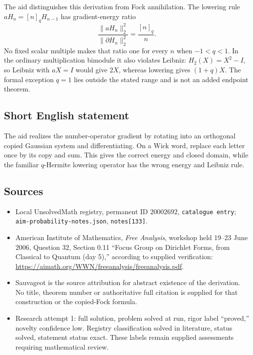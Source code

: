 \documentclass[11pt]{article}
\begin{document}
The aid distinguishes this derivation from Fock annihilation. The lowering rule $aH_n=[n]_qH_{n-1}$ has gradient-energy ratio
\[
\frac{\|aH_n\|_2^2}{\|\partial H_n\|_2^2}=\frac{[n]_q}{n}.
\]
No fixed scalar multiple makes that ratio one for every $n$ when $-1<q<1$. In the ordinary multiplication bimodule it also violates Leibniz: $H_2(X)=X^2-I$, so Leibniz with $aX=I$ would give $2X$, whereas lowering gives $(1+q)X$. The formal exception $q=1$ lies outside the stated range and is not an added endpoint theorem.
\subsection{Short English statement}
The aid realizes the number-operator gradient by rotating into an orthogonal copied Gaussian system and differentiating. On a Wick word, replace each letter once by its copy and sum. This gives the correct energy and closed domain, while the familiar $q$-Hermite lowering operator has the wrong energy and Leibniz rule.
\subsection{Sources}
\begin{itemize}
\item Local UnsolvedMath registry, permanent ID $20002692$, \texttt{catalogue entry}; \texttt{aim-probability-notes.json}, \texttt{notes[133]}.
\item American Institute of Mathematics, \emph{Free Analysis}, workshop held 19--23 June 2006, Question 32, Section 0.11 ``Focus Group on Dirichlet Forms, from Classical to Quantum (day 5),'' according to supplied verification: \url{https://aimath.org/WWN/freeanalysis/freeanalysis.pdf}.
\item Sauvageot is the source attribution for abstract existence of the derivation. No title, theorem number or authoritative full citation is supplied for that construction or the copied-Fock formula.
\item Research attempt 1: full solution, problem solved at run, rigor label ``proved,'' novelty confidence low. Registry classification solved in literature, status solved, statement status exact. These labels remain supplied assessments requiring mathematical review.
\end{itemize}
\end{document}

